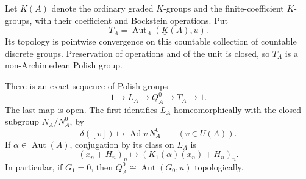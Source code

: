 Let \(\underline K(A)\) denote the ordinary graded \(K\)-groups
and the finite-coefficient \(K\)-groups, with their coefficient
and Bockstein operations. Put
\[
 T_A=\operatorname{Aut}_\Lambda(\underline K(A),u).
\]
Its topology is pointwise convergence on this countable collection
of countable discrete groups. Preservation of operations and of the
unit is closed, so \(T_A\) is a non-Archimedean Polish group.

\begin{theorem}\label{thm:un-uct}
There is an exact sequence of Polish groups
\begin{equation}\label{eq:un-uct-sequence}
 1\longrightarrow L_A\longrightarrow Q_A^0
 \longrightarrow T_A\longrightarrow1.
\end{equation}
The last map is open. The first identifies \(L_A\) homeomorphically
with the closed subgroup \(N_A/N_A^0\), by
\[
 \delta([v])\longmapsto \operatorname{Ad} v\,N_A^0\qquad(v\in U(A)).
\]
If \(\alpha\in\operatorname{Aut}(A)\), conjugation by its class on \(L_A\) is
\begin{equation}\label{eq:un-l-action}
 (x_n+H_n)_n\longmapsto
 (K_1(\alpha)(x_n)+H_n)_n.
\end{equation}
In particular, if \(G_1=0\), then
\(Q_A^0\cong\operatorname{Aut}(G_0,u)\) topologically.
\end{theorem}
